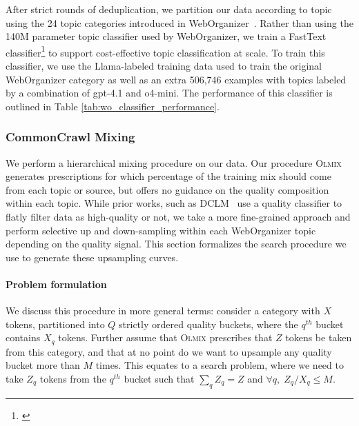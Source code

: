 \documentclass[table]{ai2style/ai2}
\newcommand{\olmix}{\textsc{Olmix}\xspace}
\begin{document}
{{After strict rounds of deduplication, we partition our data according to topic using the 24 topic categories introduced in WebOrganizer~\citep{weborganizer}. Rather than using the 140M parameter topic classifier used by WebOrganizer, we train a FastText classifier\footnote{\href{https://huggingface.co/allenai/dolma3-fasttext-weborganizer-topic-classifier}{}} to support cost-effective topic classification at scale. To train this classifier, we use the Llama-labeled training data used to train the original WebOrganizer category as well as an extra 506,746 examples with topics labeled by a combination of gpt-4.1 and o4-mini. The performance of this classifier is outlined in Table \ref{tab:wo_classifier_performance}.

\subsubsection{CommonCrawl Mixing}
\label{sec:commoncrawl-mixing}
We perform a hierarchical mixing procedure on our data. Our procedure \olmix~\citep{olmix} generates prescriptions for which percentage of the training mix should come from each topic or source, but offers no guidance on the quality composition within each topic. While prior works, such as DCLM~\citep{dclm} use a quality classifier to flatly filter data as high-quality or not, we take a more fine-grained approach and perform selective up and down-sampling within each WebOrganizer topic depending on the quality signal. This section formalizes the search procedure we use to generate these upsampling curves.

\paragraph{Problem formulation} We discuss this procedure in more general terms: consider a category with $X$ tokens, partitioned into $Q$ strictly ordered quality buckets, where the $q^{th}$ bucket contains $X_q$ tokens. Further assume that \olmix prescribes that $Z$ tokens be taken from this category, and that at no point do we want to upsample any quality bucket more than $M$ times. This equates to a search problem, where we need to take $Z_q$ tokens from the $q^{th}$ bucket such that $\sum_q Z_q= Z$ and $\forall q,\; Z_q/X_q \leq M$.

}}
\end{document}
